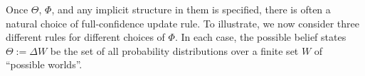 Once $\Theta$, $\Phi$, and any implicit structure in them is specified, there is often a natural choice of full-confidence update rule.
To illustrate, we now consider three different rules for different choices of $\Phi$.
In each case, the possible belief states $\Theta := \Delta W$ be the set of all probability distributions over a finite set
 $W
  $ of ``possible worlds''.


